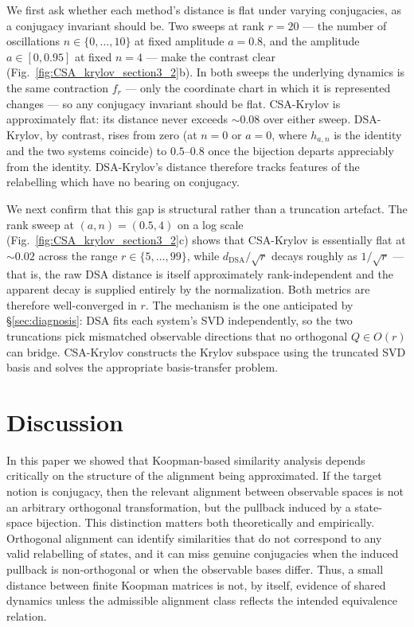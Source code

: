 \documentclass{article}
\theoremstyle{definition}
\begin{document}
We first ask whether each method's distance is flat under varying conjugacies, as a conjugacy invariant should be. Two sweeps at rank $r=20$ --- the number of oscillations $n\in\{0,\ldots,10\}$ at fixed amplitude $a=0.8$, and the amplitude $a\in[0,0.95]$ at fixed $n=4$ --- make the contrast clear (Fig.~\ref{fig:CSA_krylov_section3_2}b). In both sweeps the underlying dynamics is the same contraction $f_r$ --- only the coordinate chart in which it is represented changes --- so any conjugacy invariant should be flat. CSA-Krylov is approximately flat: its distance never exceeds $\sim\!0.08$ over either sweep. DSA-Krylov, by contrast, rises from zero (at $n=0$ or $a=0$, where $h_{a,n}$ is the identity and the two systems coincide) to $0.5$--$0.8$ once the bijection departs appreciably from the identity. DSA-Krylov's distance therefore tracks features of the relabelling which have no bearing on conjugacy.

We next confirm that this gap is structural rather than a truncation artefact. The rank sweep at $(a, n)=(0.5, 4)$ on a log scale (Fig.~\ref{fig:CSA_krylov_section3_2}c) shows that CSA-Krylov is essentially flat at $\sim\!0.02$ across the range $r\in\{5,\ldots,99\}$, while $d_{\mathrm{DSA}}/\sqrt{r}$ decays roughly as $1/\sqrt{r}$ --- that is, the raw DSA distance is itself approximately rank-independent and the apparent decay is supplied entirely by the normalization. Both metrics are therefore well-converged in $r$. The mechanism is the one anticipated by §\ref{sec:diagnosis}: DSA fits each system's SVD independently, so the two truncations pick mismatched observable directions that no orthogonal $Q\in O(r)$ can bridge. CSA-Krylov constructs the Krylov subspace using the truncated SVD basis and solves the appropriate basis-transfer problem.


\section{Discussion}
\label{sec:discussion}

In this paper we showed that Koopman-based similarity analysis depends critically on the structure of the alignment being approximated. If the target notion is conjugacy, then the relevant alignment between observable spaces is not an arbitrary orthogonal transformation, but the pullback induced by a state-space bijection. This distinction matters both theoretically and empirically. Orthogonal alignment can identify similarities that do not correspond to any valid relabelling of states, and it can miss genuine conjugacies when the induced pullback is non-orthogonal or when the observable bases differ. Thus, a small distance between finite Koopman matrices is not, by itself, evidence of shared dynamics unless the admissible alignment class reflects the intended equivalence relation.
\end{document}
